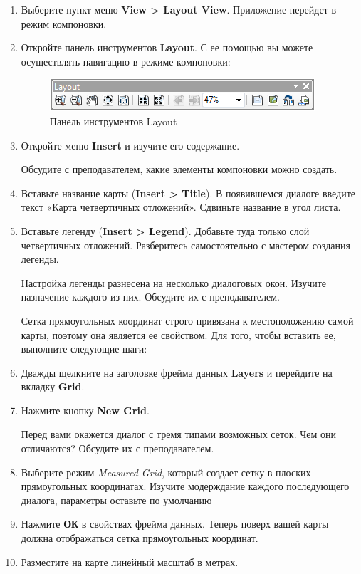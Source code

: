 \documentclass[]{book}
\theoremstyle{definition}
\theoremstyle{definition}
\theoremstyle{definition}
\theoremstyle{remark}
\begin{document}
\begin{enumerate}
\def\labelenumi{\arabic{enumi}.}
\item
  Выберите пункт меню \textbf{View \textgreater{} Layout View}.
  Приложение перейдет в режим компоновки.
\item
  Откройте панель инструментов \textbf{Layout}. С ее помощью вы можете
  осуществлять навигацию в режиме компоновки:

  \begin{figure}
  \centering
  \includegraphics{images/Ex01/image20.png}
  \caption{Панель инструментов Layout}
  \end{figure}
\item
  Откройте меню \textbf{Insert} и изучите его содержание.

  Обсудите с преподавателем, какие элементы компоновки можно создать.
\item
  Вставьте название карты (\textbf{Insert \textgreater{} Title}). В
  появившемся диалоге введите текст «Карта четвертичных отложений».
  Сдвиньте название в угол листа.
\item
  Вставьте легенду (\textbf{Insert \textgreater{} Legend}). Добавьте
  туда только слой четвертичных отложений. Разберитесь самостоятельно с
  мастером создания легенды.

  Настройка легенды разнесена на несколько диалоговых окон. Изучите
  назначение каждого из них. Обсудите их с преподавателем.

  Сетка прямоугольных координат строго привязана к местоположению самой
  карты, поэтому она является ее свойством. Для того, чтобы вставить ее,
  выполните следующие шаги:
\item
  Дважды щелкните на заголовке фрейма данных \textbf{Layers} и перейдите
  на вкладку \textbf{Grid}.
\item
  Нажмите кнопку \textbf{New Grid}.

  Перед вами окажется диалог с тремя типами возможных сеток. Чем они
  отличаются? Обсудите их с преподавателем.
\item
  Выберите режим \emph{Measured Grid}, который создает сетку в плоских
  прямоугольных координатах. Изучите модерждание каждого последующего
  диалога, параметры оставьте по умолчанию
\item
  Нажмите \textbf{ОК} в свойствах фрейма данных. Теперь поверх вашей
  карты должна отображаться сетка прямоугольных координат.
\item
  Разместите на карте линейный масштаб в метрах.
\end{enumerate}
\end{document}
